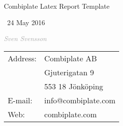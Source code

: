\documentclass[]{scrartcl}
\newcommand{\code}[2][Black]{\textcolor{#1}{\textit{#2}}}
\begin{document}
\begin{titlepage}
	\raggedright
	\null\vspace{4cm}
	
	\noindent\hrulefill\par
	{\Huge\hspace{-0.3cm} Combiplate Latex Report Template\par}
	\noindent\hrulefill\par
	
	{\Large\ 24 May 2016\par}
	
	\vspace{0.5 cm}
	{\Large\code[darkgray]{Sven Svensson}}
	
	


	



	\vfill

\hspace{8.5cm}
\small
	\begin{tabular}{ l l }
		Address: & Combiplate AB \\ 
		& Gjuterigatan 9 \\  
		& 553 18 Jönköping \\
		E-mail: & info@combiplate.com \\
		Web: & combiplate.com	     
	\end{tabular}

\end{titlepage}
\end{document}
